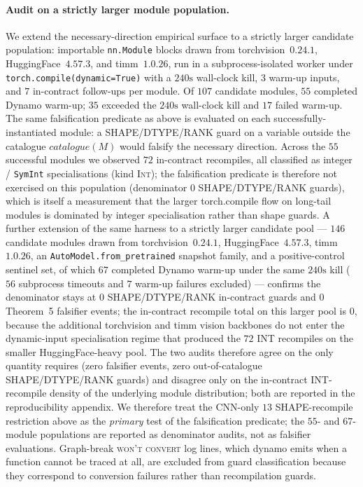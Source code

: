 \paragraph{Audit on a strictly larger module population.}
We extend the necessary-direction empirical surface to a strictly
larger candidate population: importable \texttt{nn.Module} blocks
drawn from torchvision~$0.24.1$, HuggingFace~$4.57.3$, and
timm~$1.0.26$, run in a subprocess-isolated worker under
\texttt{torch.compile(dynamic=True)} with a $240\mathrm{s}$
wall-clock kill, $3$ warm-up inputs, and $7$ in-contract
follow-ups per module. Of $107$ candidate modules, $55$ completed
Dynamo warm-up; $35$ exceeded the $240\mathrm{s}$ wall-clock kill
and $17$ failed warm-up. The same falsification predicate as above
is evaluated on each successfully-instantiated module: a
SHAPE/DTYPE/RANK guard on a variable outside the catalogue
$\mathit{catalogue}(M)$ would falsify the necessary direction.
Across the $55$ successful modules we observed $72$ in-contract
recompiles, all classified as integer / \texttt{SymInt}
specialisations (kind \textsc{Int}); the falsification predicate
is therefore not exercised on this population (denominator $0$
SHAPE/DTYPE/RANK guards), which is itself a measurement that the
larger torch.compile flow on long-tail modules is dominated by
integer specialisation rather than shape guards.
A further extension of the same harness to a strictly larger
candidate pool — $146$ candidate modules drawn from
torchvision~$0.24.1$, HuggingFace~$4.57.3$, timm~$1.0.26$, an
\texttt{AutoModel.from\_pretrained} snapshot family, and a
positive-control sentinel set, of which $67$ completed Dynamo
warm-up under the same $240\mathrm{s}$ kill ($56$ subprocess
timeouts and $7$ warm-up failures excluded) — confirms the
denominator stays at $0$ SHAPE/DTYPE/RANK in-contract guards and
$0$ Theorem~5 falsifier events; the in-contract recompile total
on this larger pool is $0$, because the additional torchvision
and timm vision backbones do not enter the dynamic-input
specialisation regime that produced the $72$ INT recompiles on
the smaller HuggingFace-heavy pool. The two audits therefore
agree on the only quantity  requires
(zero falsifier events, zero out-of-catalogue SHAPE/DTYPE/RANK
guards) and disagree only on the in-contract INT-recompile
density of the underlying module distribution; both are
reported in the reproducibility appendix.
We therefore
treat the CNN-only $13$ SHAPE-recompile restriction above as the
\emph{primary} test of the falsification predicate; the
$55$- and $67$-module populations are reported as denominator
audits, not as falsifier evaluations. Graph-break \textsc{won't convert} log
lines, which dynamo emits when a function cannot be traced at all,
are excluded from guard classification because they correspond to
conversion failures rather than recompilation guards.

